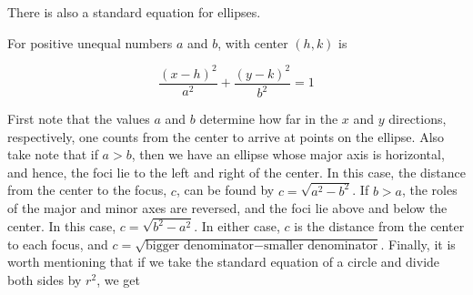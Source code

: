 \documentclass[nooutcomes]{ximera}
\begin{document}
\begin{image}
\end{image}

There is also a standard equation for ellipses. 
\begin{definition}
 For positive unequal numbers $a$ and $b$,  with center $(h,k)$ is

\[ \dfrac{(x-h)^2}{a^2} + \dfrac{(y-k)^2}{b^2} = 1 \]
\end{definition}

First note that the values $a$ and $b$ determine how far in the $x$ and $y$ directions, respectively, one counts from the center to arrive at points on the ellipse.  Also take note that if $a > b$, then we have an ellipse whose major axis is horizontal, and hence, the foci lie to the left and right of the center.  In this case, the distance from the center to the focus, $c$, can be found by $c = \sqrt{a^2 - b^2}$.  If $b > a$, the roles of the major and minor axes are reversed, and the foci lie above and below the center. In this case, $c = \sqrt{b^2 - a^2}$.  In either case, $c$ is the distance from the center to each focus, and $c = \sqrt{\mbox{bigger denominator} - \mbox{smaller denominator}}$.   Finally, it is worth mentioning that if we take the standard equation of a circle and divide both sides by $r^2$, we get
\end{document}
